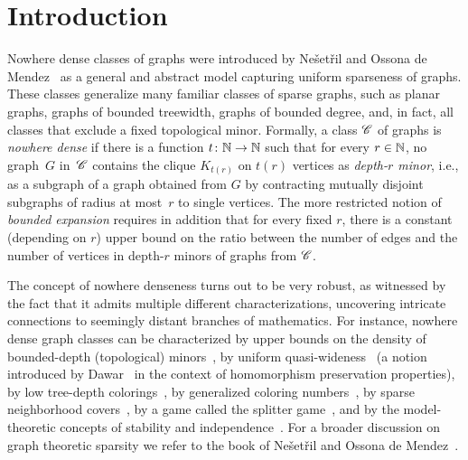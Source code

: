 \section{Introduction}\label{sec:intro}

Nowhere dense classes of graphs were introduced 
by Ne\v set\v ril and Ossona de 
Mendez~\cite{nevsetvril2010first,nevsetvril2011nowhere} as a 
general and abstract model
capturing uniform sparseness of graphs. These classes generalize many 
familiar classes of sparse graphs, such as planar graphs, graphs 
of bounded treewidth,  graphs of bounded degree, and, in fact, 
all classes that exclude a fixed 
topological minor.
Formally, a class $\mathscr{C}$ of graphs is {\em{nowhere dense}} if there is a function $t\colon \mathbb{N}\to \mathbb{N}$ such that for every $r\in \mathbb{N}$, 
no graph~$G$ in~$\mathscr{C}$ contains the clique $K_{t(r)}$ on $t(r)$ vertices  as  {\em{depth-$r$ minor}},
i.e., as a subgraph of a graph obtained from $G$ by contracting mutually disjoint  subgraphs of radius at most~$r$ to single vertices.
The more restricted notion of {\em{bounded expansion}} requires in addition that for every fixed $r$, there is a constant (depending on $r$) upper bound on the ratio 
between the number of edges and the number of vertices in depth-$r$ minors of graphs from $\mathscr{C}$.

The concept of nowhere denseness
turns out to be very robust, as witnessed by the fact that 
it admits multiple different characterizations, uncovering intricate connections to seemingly distant branches of mathematics.
For instance,  nowhere dense graph classes can be characterized 
by upper bounds on the density of bounded-depth (topological) 
minors~\cite{nevsetvril2010first,nevsetvril2011nowhere},
by uniform quasi-wideness~\cite{nevsetvril2011nowhere} (a notion introduced by
Dawar~\cite{dawar2010homomorphism} in the context of homomorphism
preservation properties), by low tree-depth
colorings~\cite{nevsetvril2008grad}, by generalized coloring
numbers~\cite{zhu2009coloring}, by sparse neighborhood
covers~\cite{GroheKRSS15,grohe2014deciding}, by a game called the
splitter game~\cite{grohe2014deciding}, and by the model-theoretic
concepts of stability and independence~\cite{adler2014interpreting}.
For a broader discussion on graph theoretic sparsity we refer to the book
of Ne\v{s}et\v{r}il and Ossona de Mendez~\cite{sparsity}.

